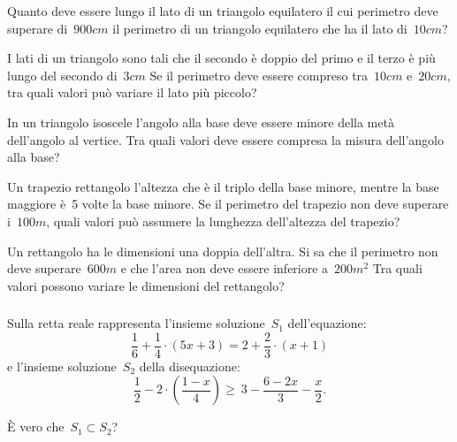 \begin{multicols}{2}
 \begin{esercizio}[\Ast]
 \label{ese:21.28}
 Quanto deve essere lungo il lato di un triangolo equilatero il cui
perimetro deve superare di~\(900\unit{cm}\) il perimetro di un triangolo
equilatero che ha il lato di~\(10\unit{cm}\)?
 \end{esercizio}

 \begin{esercizio}[\Ast]
 \label{ese:21.29}
 I lati di un triangolo sono tali che il secondo è doppio del primo e
il terzo è più lungo del secondo di~\(3\unit{cm}\) Se il perimetro deve
essere compreso tra~\(10\unit{cm}\) e~\(20\unit{cm}\), tra quali valori può variare il lato
più piccolo?
 \end{esercizio}

 \begin{esercizio}[\Ast]
 \label{ese:21.30}
 In un triangolo isoscele l'angolo
alla base deve essere minore della metà dell'angolo
al vertice. Tra quali valori deve essere compresa la misura
dell'angolo alla base?
 \end{esercizio}

 \begin{esercizio}[\Ast]
 \label{ese:21.31}
 Un trapezio rettangolo l'altezza che è il triplo
della base minore, mentre la base maggiore è~5 volte la base minore.
Se il perimetro del trapezio non deve superare i~\(100\unit{m}\), quali valori
può assumere la lunghezza dell'altezza del
trapezio?
 \end{esercizio}

 \begin{esercizio}[\Ast]
 \label{ese:21.32}
 Un rettangolo ha le dimensioni una doppia dell'altra.
Si sa che il perimetro non deve superare~\(600\unit{m}\) e che
l'area non deve essere inferiore a~\(200\unit{m^2}\) Tra quali
valori possono variare le dimensioni del rettangolo?
 \end{esercizio}
\end{multicols}

\subsubsection*{}

\begin{esercizio}
 \label{ese:21.33}
Sulla retta reale rappresenta l'insieme soluzione~\(S_{1}\)
dell'equazione:
\[\frac{1}{6}+\frac{1}{4}\cdot (5x+3)=2+\frac{2}{3}\cdot (x+1)\]
\newpage
e l'insieme soluzione~\(S_{2}\) della disequazione:
\[\frac{1}{2}-2\cdot\left(\frac{1-x}{4}\right)\ge~3-\frac{6-2x}{3}-\frac{x}{2}.\]

È vero che~\(S_{1}\subset S_{2}\)?
\end{esercizio}

